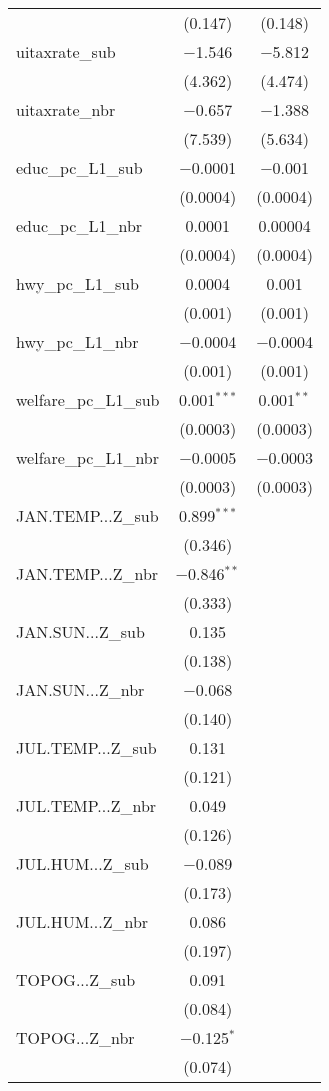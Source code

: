 \begin{table}[!htbp]
\begin{tabular}{@{\extracolsep{5pt}}lcc}
  & (0.147) & (0.148) \\ 
  uitaxrate\_sub & $-$1.546 & $-$5.812 \\ 
  & (4.362) & (4.474) \\ 
  uitaxrate\_nbr & $-$0.657 & $-$1.388 \\ 
  & (7.539) & (5.634) \\ 
  educ\_pc\_L1\_sub & $-$0.0001 & $-$0.001 \\ 
  & (0.0004) & (0.0004) \\ 
  educ\_pc\_L1\_nbr & 0.0001 & 0.00004 \\ 
  & (0.0004) & (0.0004) \\ 
  hwy\_pc\_L1\_sub & 0.0004 & 0.001 \\ 
  & (0.001) & (0.001) \\ 
  hwy\_pc\_L1\_nbr & $-$0.0004 & $-$0.0004 \\ 
  & (0.001) & (0.001) \\ 
  welfare\_pc\_L1\_sub & 0.001$^{***}$ & 0.001$^{**}$ \\ 
  & (0.0003) & (0.0003) \\ 
  welfare\_pc\_L1\_nbr & $-$0.0005 & $-$0.0003 \\ 
  & (0.0003) & (0.0003) \\ 
  JAN.TEMP...Z\_sub & 0.899$^{***}$ &  \\ 
  & (0.346) &  \\ 
  JAN.TEMP...Z\_nbr & $-$0.846$^{**}$ &  \\ 
  & (0.333) &  \\ 
  JAN.SUN...Z\_sub & 0.135 &  \\ 
  & (0.138) &  \\ 
  JAN.SUN...Z\_nbr & $-$0.068 &  \\ 
  & (0.140) &  \\ 
  JUL.TEMP...Z\_sub & 0.131 &  \\ 
  & (0.121) &  \\ 
  JUL.TEMP...Z\_nbr & 0.049 &  \\ 
  & (0.126) &  \\ 
  JUL.HUM...Z\_sub & $-$0.089 &  \\ 
  & (0.173) &  \\ 
  JUL.HUM...Z\_nbr & 0.086 &  \\ 
  & (0.197) &  \\ 
  TOPOG...Z\_sub & 0.091 &  \\ 
  & (0.084) &  \\ 
  TOPOG...Z\_nbr & $-$0.125$^{*}$ &  \\ 
  & (0.074) &  \\ 

\end{tabular}
\end{table}
